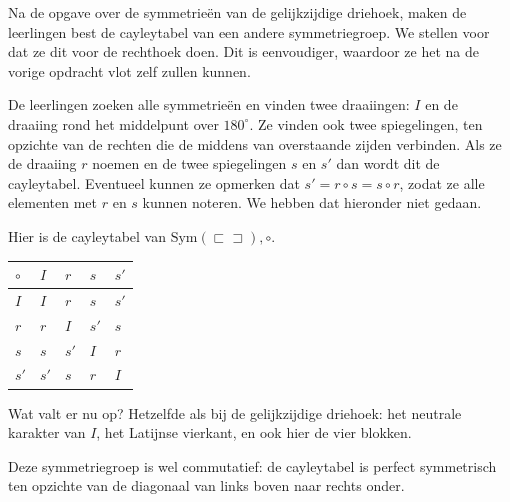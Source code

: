 \begin{multicols}{2}

Na de opgave over de symmetrieën van de gelijkzijdige driehoek, maken de leerlingen best de cayleytabel van een andere symmetriegroep. We stellen voor dat ze dit voor de rechthoek doen. Dit is eenvoudiger, waardoor ze het na de vorige opdracht vlot zelf zullen kunnen.


De leerlingen zoeken alle symmetrieën en vinden twee draaiingen: $I$ en de draaiing rond het middelpunt over $180^\circ$. Ze vinden ook twee spiegelingen, ten opzichte van de rechten die de middens van overstaande zijden verbinden. Als ze de draaiing $r$ noemen en de twee spiegelingen $s$ en $s'$ dan wordt dit de cayleytabel. Eventueel kunnen ze opmerken dat $s'=r\circ s=s\circ r$, zodat ze alle elementen met $r$ en $s$ kunnen noteren. We hebben dat hieronder niet gedaan.

Hier is de cayleytabel van $\text{Sym}(\sqsubset \! \sqsupset), \circ$.

\begin{center}
		
\begin{tabel}

\setlength{\extrarowheight}{1.5pt}

		\begin{tabular}{| C{1cm} | C{1cm}| C{1cm}| C{1cm} |C{1cm}| } 
		\hline
		 $\circ$ & $I$ & $r$ & $s$ & $s'$ \\
			\hline
 			 $I$ & $I$ & $r$ &$s$ & $s'$\\
			 $r$ & $r$ & $I$ & $s'$ &$s$ \\
			 $s$ & $s$ & $s'$ & $I$ & $r$ \\
			 $s'$ & $s'$ & $s$ & $r$ & $I$ \\
			 \hline
		\end{tabular}		
		
		\end{tabel}
		
		\end{center}
		
Wat valt er nu op? Hetzelfde als bij de gelijkzijdige driehoek: het neutrale karakter van $I$, het Latijnse vierkant, en ook hier de vier blokken.

Deze symmetriegroep is wel commutatief: de cayleytabel is perfect symmetrisch ten opzichte van de diagonaal van links boven naar rechts onder.
 

\end{multicols}
